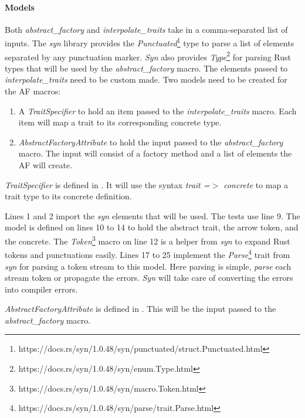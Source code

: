 \paragraph{Models}
Both \textit{abstract\_factory} and \textit{interpolate\_traits} take in a comma-separated list of inputs.
The \textit{syn} library provides the \textit{Punctuated}\footnote{https://docs.rs/syn/1.0.48/syn/punctuated/struct.Punctuated.html} type to parse a list of elements separated by any punctuation marker.
\textit{Syn} also provides \textit{Type}\footnote{https://docs.rs/syn/1.0.48/syn/enum.Type.html} for parsing Rust types that will be used by the \textit{abstract\_factory} macro.
The elements passed to \textit{interpolate\_traits} need to be custom made.
Two models need to be created for the AF macros:

\begin{enumerate}
	\item A \textit{TraitSpecifier} to hold an item passed to the \textit{interpolate\_traits} macro.
	      Each item will map a trait to its corresponding concrete type.
	\item \textit{AbstractFactoryAttribute} to hold the input passed to the \textit{abstract\_factory} macro.
	      The input will consist of a factory method and a list of elements the AF will create.
\end{enumerate}

\textit{TraitSpecifier} is defined in .
It will use the syntax \textit{trait =$>$ concrete} to map a trait type to its concrete definition.


Lines 1 and 2 import the \textit{syn} elements that will be used.
The tests use line 9.
The model is defined on lines 10 to 14 to hold the abstract trait, the arrow token, and the concrete.
The \textit{Token}\footnote{https://docs.rs/syn/1.0.48/syn/macro.Token.html} macro on line 12 is a helper from \textit{syn} to expand Rust tokens and punctuations easily.
Lines 17 to 25 implement the \textit{Parse}\footnote{https://docs.rs/syn/1.0.48/syn/parse/trait.Parse.html} trait from \textit{syn} for parsing a token stream to this model.
Here parsing is simple, \textit{parse} each stream token or propagate the errors.
\textit{Syn} will take care of converting the errors into compiler errors.

\textit{AbstractFactoryAttribute} is defined in .
This will be the input passed to the \textit{abstract\_factory} macro.

